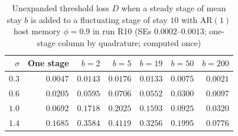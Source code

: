 \begin{table}[htbp]\centering\small
\caption{Unexpanded threshold loss $D$ when a steady stage of mean stay $b$ is added to a fluctuating stage of stay $10$ with $\mathrm{AR}(1)$ host memory $\phi = 0.9$ in run R10 (SEs $0.0002$--$0.0013$; one-stage column by quadrature; computed once)}\label{num-esm-tab-r10-h5}
\begin{tabular}{rrrrrrr}\toprule
$\sigma$ & One stage & $b = 2$ & $b = 5$ & $b = 19$ & $b = 50$ & $b = 200$\\\midrule
$0.3$ & $0.0047$ & $0.0143$ & $0.0176$ & $0.0133$ & $0.0075$ & $0.0021$\\
$0.6$ & $0.0205$ & $0.0595$ & $0.0706$ & $0.0552$ & $0.0300$ & $0.0097$\\
$1.0$ & $0.0692$ & $0.1718$ & $0.2025$ & $0.1593$ & $0.0925$ & $0.0320$\\
$1.4$ & $0.1685$ & $0.3584$ & $0.4119$ & $0.3256$ & $0.1995$ & $0.0776$\\\bottomrule
\end{tabular}
\end{table}


